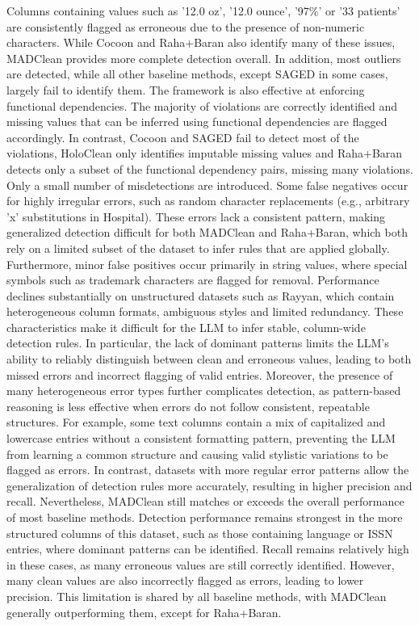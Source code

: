 Columns containing values such as '12.0 oz', '12.0 ounce', '97\%' or '33 patients' are consistently flagged as erroneous due to the presence of non-numeric characters. 
While Cocoon and Raha+Baran also identify many of these issues, MADClean provides more complete detection overall. 
In addition, most outliers are detected, while all other baseline methods, except SAGED in some cases, largely fail to identify them.
\newline\newline
The framework is also effective at enforcing functional dependencies. 
The majority of violations are correctly identified and missing values that can be inferred using functional dependencies are flagged accordingly. 
In contrast, Cocoon and SAGED fail to detect most of the violations, HoloClean only identifies imputable missing values and Raha+Baran detects only a subset of the functional dependency pairs, missing many violations.
\newline\newline
Only a small number of misdetections are introduced. 
Some false negatives occur for highly irregular errors, such as random character replacements (e.g., arbitrary 'x' substitutions in Hospital). 
These errors lack a consistent pattern, making generalized detection difficult for both MADClean and Raha+Baran, which both rely on a limited subset of the dataset to infer rules that are applied globally. 
Furthermore, minor false positives occur primarily in string values, where special symbols such as trademark characters are flagged for removal.
\newline\newline
Performance declines substantially on unstructured datasets such as Rayyan, which contain heterogeneous column formats, ambiguous styles and limited redundancy. 
These characteristics make it difficult for the LLM to infer stable, column-wide detection rules. 
In particular, the lack of dominant patterns limits the LLM's ability to reliably distinguish between clean and erroneous values, leading to both missed errors and incorrect flagging of valid entries.
Moreover, the presence of many heterogeneous error types further complicates detection, as pattern-based reasoning is less effective when errors do not follow consistent, repeatable structures. 
For example, some text columns contain a mix of capitalized and lowercase entries without a consistent formatting pattern, preventing the LLM from learning a common structure and causing valid stylistic variations to be flagged as errors.
In contrast, datasets with more regular error patterns allow the generalization of detection rules more accurately, resulting in higher precision and recall.
Nevertheless, MADClean still matches or exceeds the overall performance of most baseline methods. 
Detection performance remains strongest in the more structured columns of this dataset, such as those containing language or ISSN entries, where dominant patterns can be identified. 
Recall remains relatively high in these cases, as many erroneous values are still correctly identified.
However, many clean values are also incorrectly flagged as errors, leading to lower precision. 
This limitation is shared by all baseline methods, with MADClean generally outperforming them, except for Raha+Baran.

